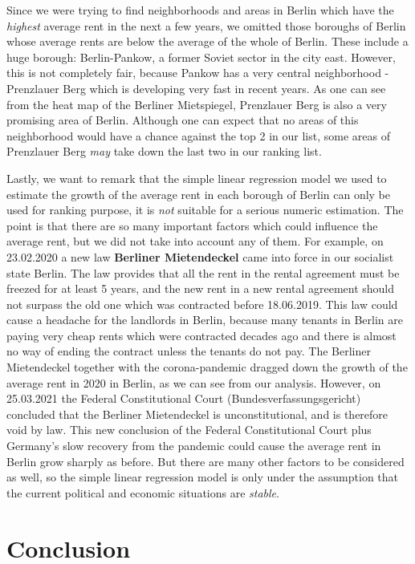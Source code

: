 \documentclass[11pt]{article}
\begin{document}
Since we were trying to find neighborhoods and areas in Berlin which
have the \emph{highest} average rent in the next a few years, we omitted
those boroughs of Berlin whose average rents are below the average of
the whole of Berlin. These include a huge borough: Berlin-Pankow, a
former Soviet sector in the city east. However, this is not completely
fair, because Pankow has a very central neighborhood - Prenzlauer Berg
which is developing very fast in recent years. As one can see from the
heat map of the Berliner Mietspiegel, Prenzlauer Berg is also a very
promising area of Berlin. Although one can expect that no areas of this
neighborhood would have a chance against the top 2 in our list, some
areas of Prenzlauer Berg \emph{may} take down the last two in our
ranking list.

    Lastly, we want to remark that the simple linear regression model we
used to estimate the growth of the average rent in each borough of
Berlin can only be used for ranking purpose, it is \emph{not} suitable
for a serious numeric estimation. The point is that there are so many
important factors which could influence the average rent, but we did not
take into account any of them. For example, on 23.02.2020 a new law
\textbf{Berliner Mietendeckel} came into force in our socialist state
Berlin. The law provides that all the rent in the rental agreement must
be freezed for at least 5 years, and the new rent in a new rental
agreement should not surpass the old one which was contracted before
18.06.2019. This law could cause a headache for the landlords in Berlin,
because many tenants in Berlin are paying very cheap rents which were
contracted decades ago and there is almost no way of ending the contract
unless the tenants do not pay. The Berliner Mietendeckel together with
the corona-pandemic dragged down the growth of the average rent in 2020
in Berlin, as we can see from our analysis. However, on 25.03.2021 the
Federal Constitutional Court (Bundesverfassungsgericht) concluded that
the Berliner Mietendeckel is unconstitutional, and is therefore void by
law. This new conclusion of the Federal Constitutional Court plus
Germany's slow recovery from the pandemic could cause the average rent
in Berlin grow sharply as before. But there are many other factors to be
considered as well, so the simple linear regression model is only under
the assumption that the current political and economic situations are
\emph{stable}.

    \hypertarget{conclusion}{%
\section{\texorpdfstring{Conclusion
}{Conclusion }}\label{conclusion}}
\end{document}
